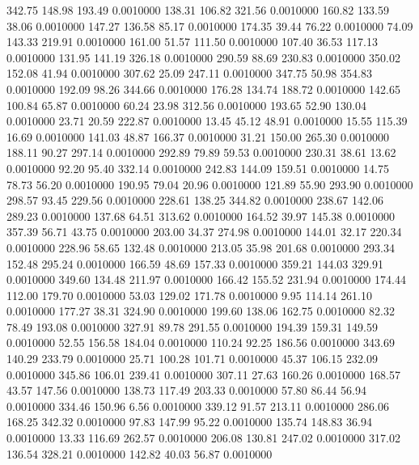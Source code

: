  342.75  148.98  193.49   0.0010000
 138.31  106.82  321.56   0.0010000
 160.82  133.59   38.06   0.0010000
 147.27  136.58   85.17   0.0010000
 174.35   39.44   76.22   0.0010000
  74.09  143.33  219.91   0.0010000
 161.00   51.57  111.50   0.0010000
 107.40   36.53  117.13   0.0010000
 131.95  141.19  326.18   0.0010000
 290.59   88.69  230.83   0.0010000
 350.02  152.08   41.94   0.0010000
 307.62   25.09  247.11   0.0010000
 347.75   50.98  354.83   0.0010000
 192.09   98.26  344.66   0.0010000
 176.28  134.74  188.72   0.0010000
 142.65  100.84   65.87   0.0010000
  60.24   23.98  312.56   0.0010000
 193.65   52.90  130.04   0.0010000
  23.71   20.59  222.87   0.0010000
  13.45   45.12   48.91   0.0010000
  15.55  115.39   16.69   0.0010000
 141.03   48.87  166.37   0.0010000
  31.21  150.00  265.30   0.0010000
 188.11   90.27  297.14   0.0010000
 292.89   79.89   59.53   0.0010000
 230.31   38.61   13.62   0.0010000
  92.20   95.40  332.14   0.0010000
 242.83  144.09  159.51   0.0010000
  14.75   78.73   56.20   0.0010000
 190.95   79.04   20.96   0.0010000
 121.89   55.90  293.90   0.0010000
 298.57   93.45  229.56   0.0010000
 228.61  138.25  344.82   0.0010000
 238.67  142.06  289.23   0.0010000
 137.68   64.51  313.62   0.0010000
 164.52   39.97  145.38   0.0010000
 357.39   56.71   43.75   0.0010000
 203.00   34.37  274.98   0.0010000
 144.01   32.17  220.34   0.0010000
 228.96   58.65  132.48   0.0010000
 213.05   35.98  201.68   0.0010000
 293.34  152.48  295.24   0.0010000
 166.59   48.69  157.33   0.0010000
 359.21  144.03  329.91   0.0010000
 349.60  134.48  211.97   0.0010000
 166.42  155.52  231.94   0.0010000
 174.44  112.00  179.70   0.0010000
  53.03  129.02  171.78   0.0010000
   9.95  114.14  261.10   0.0010000
 177.27   38.31  324.90   0.0010000
 199.60  138.06  162.75   0.0010000
  82.32   78.49  193.08   0.0010000
 327.91   89.78  291.55   0.0010000
 194.39  159.31  149.59   0.0010000
  52.55  156.58  184.04   0.0010000
 110.24   92.25  186.56   0.0010000
 343.69  140.29  233.79   0.0010000
  25.71  100.28  101.71   0.0010000
  45.37  106.15  232.09   0.0010000
 345.86  106.01  239.41   0.0010000
 307.11   27.63  160.26   0.0010000
 168.57   43.57  147.56   0.0010000
 138.73  117.49  203.33   0.0010000
  57.80   86.44   56.94   0.0010000
 334.46  150.96    6.56   0.0010000
 339.12   91.57  213.11   0.0010000
 286.06  168.25  342.32   0.0010000
  97.83  147.99   95.22   0.0010000
 135.74  148.83   36.94   0.0010000
  13.33  116.69  262.57   0.0010000
 206.08  130.81  247.02   0.0010000
 317.02  136.54  328.21   0.0010000
 142.82   40.03   56.87   0.0010000
